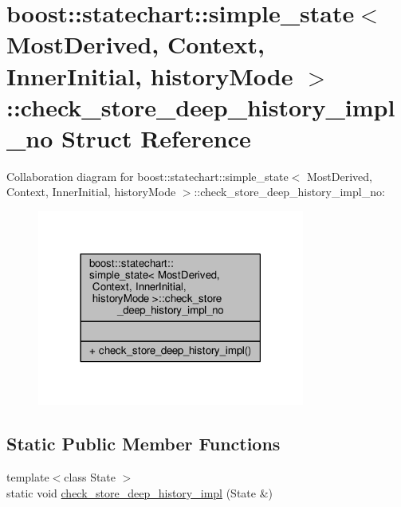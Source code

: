 \hypertarget{structboost_1_1statechart_1_1simple__state_1_1check__store__deep__history__impl__no}{}\section{boost\+:\+:statechart\+:\+:simple\+\_\+state$<$ Most\+Derived, Context, Inner\+Initial, history\+Mode $>$\+:\+:check\+\_\+store\+\_\+deep\+\_\+history\+\_\+impl\+\_\+no Struct Reference}
\label{structboost_1_1statechart_1_1simple__state_1_1check__store__deep__history__impl__no}


Collaboration diagram for boost\+:\+:statechart\+:\+:simple\+\_\+state$<$ Most\+Derived, Context, Inner\+Initial, history\+Mode $>$\+:\+:check\+\_\+store\+\_\+deep\+\_\+history\+\_\+impl\+\_\+no\+:
\nopagebreak
\begin{figure}[H]
\begin{center}
\leavevmode
\includegraphics[width=249pt]{structboost_1_1statechart_1_1simple__state_1_1check__store__deep__history__impl__no__coll__graph}
\end{center}
\end{figure}
\subsection*{Static Public Member Functions}
\begin{DoxyCompactItemize}
\item 
{\footnotesize template$<$class State $>$ }\\static void \mbox{\hyperlink{structboost_1_1statechart_1_1simple__state_1_1check__store__deep__history__impl__no_a3163ab74baacc670591fbb5a0f50768c}{check\+\_\+store\+\_\+deep\+\_\+history\+\_\+impl}} (State \&)
\end{DoxyCompactItemize}


